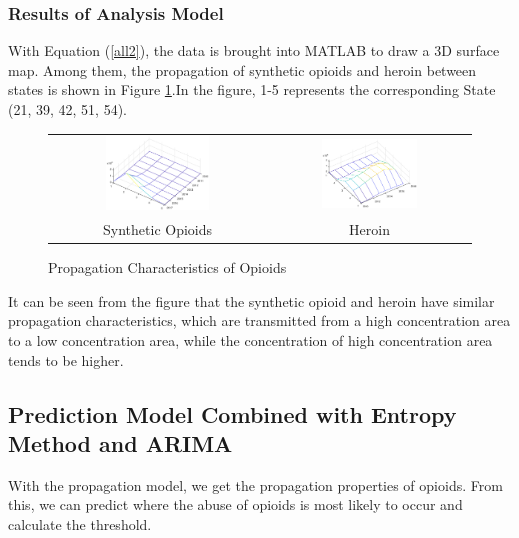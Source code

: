\documentclass[12pt]{mcmthesis}
\begin{document}
\subsubsection{Results of Analysis Model}
With Equation (\ref{all2}), the data is brought into MATLAB to draw a 3D surface map. Among them, the propagation of synthetic opioids and heroin between states is shown in Figure \ref{opioids}.In the figure, 1-5 represents the corresponding State (21, 39, 42, 51, 54).
\begin{figure}[htbp]
\centering
\begin{tabular}{cc}
 \includegraphics[width=0.5\textwidth]{figures/synthetic.eps} &   \includegraphics[width=0.5\textwidth]{figures/herion.eps}\\
 Synthetic Opioids&Heroin\\
\end{tabular}
  \caption{Propagation Characteristics of Opioids}\label{opioids}
\end{figure}\par
It can be seen from the figure that the synthetic opioid and heroin have similar propagation characteristics, which are transmitted from a high concentration area to a low concentration area, while the concentration of high concentration area tends to be higher.
\subsection{Prediction Model Combined with Entropy Method and ARIMA }
With the propagation model, we get the propagation properties of opioids. From this, we can predict where the abuse of opioids is most likely to occur and calculate the threshold.
\end{document}
